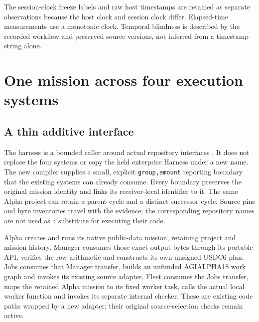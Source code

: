 \documentclass[11pt]{article}
\begin{document}
The session-clock freeze labels and raw host timestamps are retained as separate observations because the host clock and session clock differ. Elapsed-time measurements use a monotonic clock. Temporal blindness is described by the recorded workflow and preserved source versions, not inferred from a timestamp string alone.



\section{One mission across four execution systems}

\subsection{A thin additive interface}

The harness is a bounded caller around actual repository interfaces \cite{alphasource,managersource,jobssource,fleetsource}. It does not replace the four systems or copy the held enterprise Harness under a new name. The new compiler supplies a small, explicit \texttt{group,amount} reporting boundary that the existing systems can already consume. Every boundary preserves the original mission identity and links its receiver-local identifier to it. The same Alpha project can retain a parent cycle and a distinct successor cycle. Source pins and byte inventories travel with the evidence; the corresponding repository names are not used as a substitute for executing their code.

Alpha creates and runs its native public-data mission, retaining project and mission history. Manager consumes those exact output bytes through its portable API, verifies the row arithmetic and constructs its own unsigned USDC6 plan. Jobs consumes that Manager transfer, builds an unfunded AGIALPHA18 work graph and invokes its existing source adapter. Fleet consumes the Jobs transfer, maps the retained Alpha mission to its fixed worker task, calls the actual local worker function and invokes its separate internal checker. These are existing code paths wrapped by a new adapter; their original source-selection checks remain active.
\end{document}
